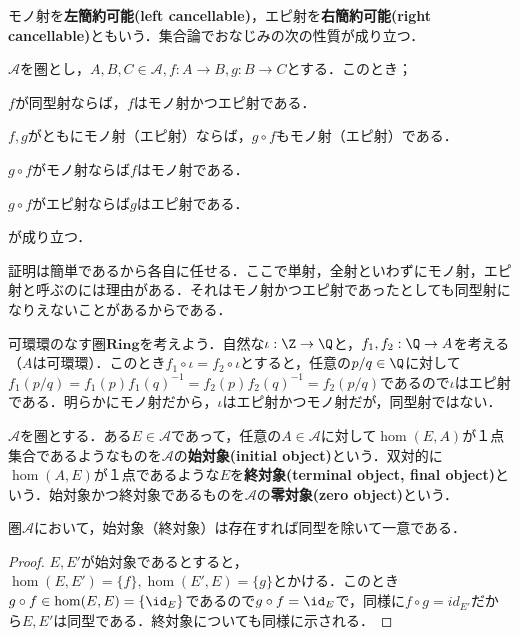 モノ射を\textbf{左簡約可能(left cancellable)}，エピ射を\textbf{右簡約可能(right cancellable)}ともいう．集合論でおなじみの次の性質が成り立つ．

\begin{prop}
	$\mathscr{A}$を圏とし，$A,B,C\in\mathscr{A},f:A\to B,g:B\to C$とする．このとき；
	\begin{sakura}
		\item $f$が同型射ならば，$f$はモノ射かつエピ射である．
		\item $f,g$がともにモノ射（エピ射）ならば，$g\circ f$もモノ射（エピ射）である．
		\item $g\circ f$がモノ射ならば$f$はモノ射である．
		\item $g\circ f$がエピ射ならば$g$はエピ射である．
	\end{sakura}
	が成り立つ．
\end{prop}

証明は簡単であるから各自に任せる．ここで単射，全射といわずにモノ射，エピ射と呼ぶのには理由がある．それはモノ射かつエピ射であったとしても同型射になりえないことがあるからである．
\begin{ex}
可環環のなす圏$\mathbf{Ring}$を考えよう．自然な$\iota:\Z\to\Q$と，$f_1,f_2:\Q\to A$を考える（$A$は可環環）．このとき$f_1\circ\iota=f_2\circ\iota$とすると，任意の$p/q\in\Q$に対して$f_1(p/q)=f_1(p)f_1(q)^{-1}=f_2(p)f_2(q)^{-1}=f_2(p/q)$であるので$\iota$はエピ射である．明らかにモノ射だから，$\iota$はエピ射かつモノ射だが，同型射ではない．
\end{ex}

\begin{defi}
	$\mathscr{A}$を圏とする．ある$E\in\mathscr{A}$であって，任意の$A\in\mathscr{A}$に対して$\hom(E,A)$が１点集合であるようなものを$\mathscr{A}$の\textbf{始対象(initial object)}という．双対的に$\hom(A,E)$が１点であるような$E$を\textbf{終対象(terminal object, final object)}という．始対象かつ終対象であるものを$\mathscr{A}$の\textbf{零対象(zero object)}という．
\end{defi}

\begin{prop}
	圏$\mathscr{A}$において，始対象（終対象）は存在すれば同型を除いて一意である．
\end{prop}

\begin{proof}
	$E,E'$が始対象であるとすると，$\hom(E,E')=\{f\},\hom(E',E)=\{g\}$とかける．このとき$g\circ f\in\hom(E,E)=\{\id_E\}$であるので$g\circ f=\id_E$で，同様に$f\circ g=id_{E'}$だから$E,E'$は同型である．終対象についても同様に示される．
\end{proof}

